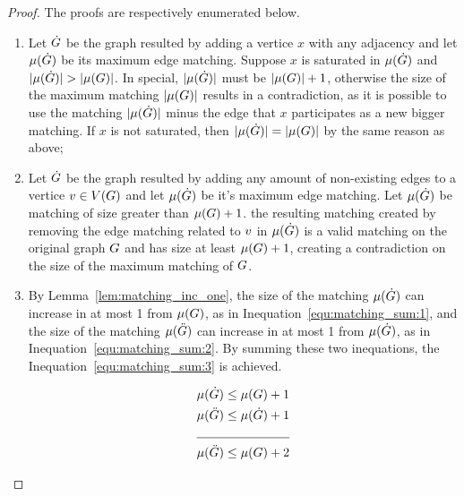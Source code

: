 \documentclass[msc]{ppgccufmg}    %
\begin{document}
\begin{proof}
The proofs are respectively enumerated below.
    \begin{enumerate}
        \item Let $\dot{G}$ be the graph resulted by adding a vertice $x$ with any 
adjacency and let $\mu(\dot{G})$ be its maximum edge matching.
Suppose $x$ is saturated in $\mu(\dot{G})$ and $|\mu(\dot{G})| > |\mu(G)|$. 
In special, $|\mu(\dot{G})|$ must be $|\mu(G)| + 1$, otherwise the size of the maximum matching $|\mu(G)|$ results in a contradiction, as it is possible to use the matching 
$|\mu(\dot{G})|$ minus the edge that $x$ participates as a 
new bigger matching.
If $x$ is not saturated, then $|\mu(\dot{G})| = |\mu(G)|$ by the same reason as above;
        \item Let $\dot{G}$ be the graph resulted by adding any amount of non-existing 
edges to a vertice $v \in V(G)$ and let $\mu(\dot{G})$ be it's 
maximum edge matching.
Let $\mu(\dot{G})$ be matching of size greater than $\mu(G) + 1$.
the resulting matching created by removing the edge matching related to $v$ in 
$\mu(\dot{G})$ is a valid matching on the original graph $G$ and has
size at least $\mu(G) + 1$, creating a contradiction on the size of the maximum
matching of $G$.
        \item By Lemma~\ref{lem:matching_inc_one}, the size of the matching 
        $\mu(\dot{G})$ can increase in at most 1 from $\mu(G)$,
        as in Inequation~\ref{equ:matching_sum:1}, and the size of the matching $\mu(\ddot{G})$ can increase in at most 1 from $\mu(\dot{G})$, as in
        Inequation~\ref{equ:matching_sum:2}.
        By summing these two inequations, the Inequation~\ref{equ:matching_sum:3} is achieved.
        
            \begin{alignat}{2}
            \centering
            &\matchingOf{\sub {\graphG}} \leq \matchingOf{\graphG} + 1 \label{equ:matching_sum:1}\\
            &\matchingOf{\ssub{\graphG}} \leq \matchingOf{\sub{\graphG}} + 1 \label{equ:matching_sum:2}\\ 
            \cline{1-2}
            &\matchingOf{\ssub{\graphG}} \leq \matchingOf{\graphG} + 2 \label{equ:matching_sum:3}
            \end{alignat}
    \end{enumerate}
\end{proof}
\end{document}
